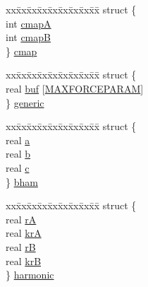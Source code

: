\begin{DoxyCompactItemize}
\begin{tabbing}
\end{tabbing}\item 
\begin{tabbing}
xx\=xx\=xx\=xx\=xx\=xx\=xx\=xx\=xx\=\kill
struct \{\\
\>int \hyperlink{uniont__iparams_a96108be8534affe967e3a4aec97cb72c}{cmapA}\\
\>int \hyperlink{uniont__iparams_af112bc252ed4633980dca8b8756c27ad}{cmapB}\\
\} \hyperlink{uniont__iparams_abbc5d23076e5f282709ae12f4bbc7e15}{cmap}\\

\end{tabbing}\item 
\begin{tabbing}
xx\=xx\=xx\=xx\=xx\=xx\=xx\=xx\=xx\=\kill
struct \{\\
\>real \hyperlink{uniont__iparams_ac2b28e06a58d003b10de8a80e9aebe85}{buf} \mbox{[}\hyperlink{share_2template_2gromacs_2types_2idef_8h_aa485bece733ea79b0527f4a8b61c8f38}{MAXFORCEPARAM}\mbox{]}\\
\} \hyperlink{uniont__iparams_ac5b84f598aba91907c58ec4f3f6fe8a7}{generic}\\

\end{tabbing}\item 
\begin{tabbing}
xx\=xx\=xx\=xx\=xx\=xx\=xx\=xx\=xx\=\kill
struct \{\\
\>real \hyperlink{uniont__iparams_a070fd67041cc597a6c1ec5efeee18969}{a}\\
\>real \hyperlink{uniont__iparams_aecf26369e3ec0909a09fe8be715e3a0e}{b}\\
\>real \hyperlink{uniont__iparams_a6f12f82807f6b417c8982bbb5a27af83}{c}\\
\} \hyperlink{uniont__iparams_a386bc7c5c9d73b67d26b178f919cf7c2}{bham}\\

\end{tabbing}\item 
\begin{tabbing}
xx\=xx\=xx\=xx\=xx\=xx\=xx\=xx\=xx\=\kill
struct \{\\
\>real \hyperlink{uniont__iparams_a140d0cfa7716976087a09c992fce9826}{rA}\\
\>real \hyperlink{uniont__iparams_aae31dcba1c5001352979988bca268bd0}{krA}\\
\>real \hyperlink{uniont__iparams_a201b81e15b8da67bf64b6fa4634df60d}{rB}\\
\>real \hyperlink{uniont__iparams_a047f6ac20bbfac244cb0f5c639a6b3eb}{krB}\\
\} \hyperlink{uniont__iparams_ac0bddfaa2f6682c1ab8c03b4c1acd36b}{harmonic}\\


\end{tabbing}
\end{DoxyCompactItemize}
